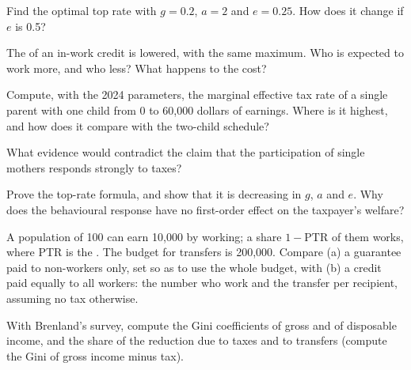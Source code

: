 \begin{exercise}[$\star\star$]\label{exo:b3:transfers-and-incentives:6}
Find the optimal top rate with $g = 0.2$, $a = 2$ and $e = 0.25$. How does it change if $e$ is 0.5?
\end{exercise}

\begin{exercise}[$\star\star$]\label{exo:b3:transfers-and-incentives:7}
The  of an in-work credit is lowered, with the same maximum. Who is
expected to work more, and who less? What happens to the cost?
\end{exercise}

\begin{exercise}[$\star\star$]\label{exo:b3:transfers-and-incentives:8}
Compute, with the 2024 parameters, the marginal effective tax rate of a single parent
with one child from 0 to 60{,}000 dollars of earnings. Where is it highest, and how
does it compare with the two-child schedule?
\end{exercise}

\begin{exercise}[$\star\star$]\label{exo:b3:transfers-and-incentives:9}
What evidence would contradict the claim that the participation of single mothers
responds strongly to taxes?
\end{exercise}

\begin{exercise}[$\star\star\star$]\label{exo:b3:transfers-and-incentives:10}
Prove the top-rate formula, and show that it is decreasing in $g$, $a$ and $e$. Why does the
behavioural response have no first-order effect on the taxpayer's welfare?
\end{exercise}

\begin{exercise}[$\star\star\star$]\label{exo:b3:transfers-and-incentives:11}
A population of 100 can earn 10{,}000 by working; a share $1 - \mathrm{PTR}$ of them works, where PTR is
the . The budget for transfers is 200{,}000. Compare (a) a
guarantee paid to non-workers only, set so as to use the whole budget, with (b) a
credit paid equally to all workers: the number who work and the transfer per
recipient, assuming no tax otherwise.
\end{exercise}

\begin{exercise}[$\star\star\star$]\label{exo:b3:transfers-and-incentives:12}
With Brenland's survey, compute the Gini coefficients of gross and of disposable
income, and the share of the reduction due to taxes and to transfers (compute the
Gini of gross income minus tax).
\end{exercise}


